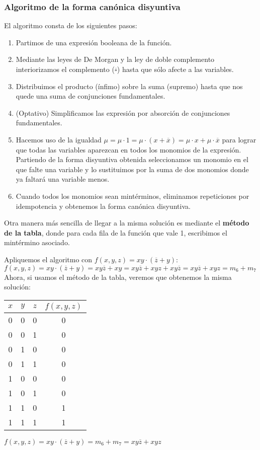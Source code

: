\subsubsection{Algoritmo de la forma canónica disyuntiva}
El algoritmo consta de los siguientes pasos:
\begin{enumerate}
    \item Partimos de una expresión booleana de la función.
    \item Mediante las leyes de De Morgan y la ley de doble complemento interiorizamos el complemento ($\overline{\square}$) hasta que sólo afecte a las variables.
    \item Distribuimos el producto (ínfimo) sobre la suma (supremo) hasta que nos quede una suma de conjunciones fundamentales.
    \item (Optativo) Simplificamos las expresión por absorción de conjunciones fundamentales.
    \item Hacemos uso de la igualdad $\mu = \mu \cdot 1 = \mu \cdot (x + \overline{x}) = \mu \cdot x + \mu \cdot \overline{x}$ para lograr que todas las variables aparezcan en todos los monomios de la expresión. Partiendo de la forma disyuntiva obtenida
          seleccionamos un monomio en el que falte una variable y lo sustituimos por la suma de dos monomios donde ya faltará una variable menos.
    \item Cuando todos los monomios sean mintérminos, eliminamos repeticiones por idempotencia y obtenemos la forma canónica disyuntiva.
\end{enumerate}
Otra manera más sencilla de llegar a la misma solución es mediante el \textbf{método de la tabla}, donde para cada fila de la función que vale 1, escribimos el mintérmino asociado.
\begin{ejemplo}
    Apliquemos el algoritmo con $f(x,y,z) = xy \cdot (\overline{z} + y)$: \\
    $f(x,y,z) = xy \cdot (\overline{z} + y) = xy\overline{z} + xy = xy\overline{z} + xyz + xy\overline{z} = xy\overline{z} + xyz = m_6 + m_7$
    Ahora, si usamos el método de la tabla, veremos que obtenemos la misma solución:
    \begin{center}
        \begin{tabular}{ |c|c|c||c|  }
            \hline
            $x$ & $y$ & $z$ & $f(x,y,z)$ \\
            \hline
            0   & 0   & 0   & 0          \\
            0   & 0   & 1   & 0          \\
            0   & 1   & 0   & 0          \\
            0   & 1   & 1   & 0          \\
            1   & 0   & 0   & 0          \\
            1   & 0   & 1   & 0          \\
            1   & 1   & 0   & 1          \\
            1   & 1   & 1   & 1          \\
            \hline
        \end{tabular}
    \end{center}
    \centering $f(x,y,z) = xy \cdot (\overline{z}+y) = m_6 + m_7 = xy\overline{z} + xyz$
\end{ejemplo}
